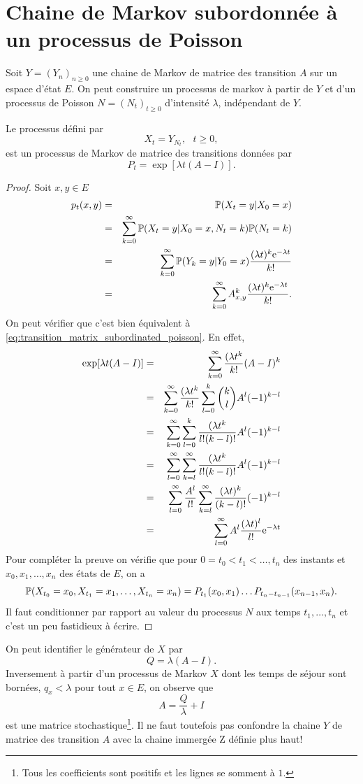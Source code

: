 \section{Chaine de Markov subordonnée à un processus de Poisson}\label{sec:subordinated_poisson}
Soit $Y=(Y_n)_{n\geq 0}$ une chaine de Markov de matrice des transition $A$ sur un espace d'état $E$. On peut construire un processus de markov à partir de $Y$ et d'un processus de Poisson $N = (N_t)_{t\geq 0}$ d'intensité $\lambda$, indépendant de $Y$.
\begin{prop}\label{prop:subordinated_poisson}
Le processus défini par 
$$
X_t = Y_{N_t},\text{ }t\geq 0,
$$
est un processus de Markov de matrice des transitions données par 
$$
P_t = \exp[\lambda t(A - I)].
$$
\end{prop}
\begin{proof}
Soit $x,y \in E$
\begin{eqnarray*}
p_t(x,y) &=& \mathbb{P}(X_t = y|X_0 = x)\\
&=&\sum_{k=0}^\infty\mathbb{P}(X_t = y|X_0 = x, N_t = k)\mathbb{P}(N_t = k)\\
&=&\sum_{k=0}^\infty\mathbb{P}(Y_k = y|Y_0 = x)\frac{(\lambda t)^k\mathrm{e}^{-\lambda t} }{k!}\\
&=&\sum_{k=0}^\infty A^k_{x,y}\frac{(\lambda t)^k\mathrm{e}^{-\lambda t} }{k!}.
\end{eqnarray*}
On peut vérifier que c'est bien équivalent à \eqref{eq:transition_matrix_subordinated_poisson}. En effet, 
\begin{eqnarray*}
\exp[\lambda t(A - I)]&=& \sum_{k=0}^\infty\frac{(\lambda t^k}{k!}(A-I)^k\\
&=&\sum_{k=0}^\infty\frac{(\lambda t^k}{k!}\sum_{l=0}^k\binom{k}{l}A^l(-1)^{k-l}\\
&=&\sum_{k=0}^\infty\sum_{l=0}^k\frac{(\lambda t^k}{l!(k-l)!}A^l(-1)^{k-l}\\
&=&\sum_{l=0}^\infty\sum_{k=l}^\infty\frac{(\lambda t^k}{l!(k-l)!}A^l(-1)^{k-l}\\
&=&\sum_{l=0}^\infty \frac{A^l}{l!}\sum_{k=l}^\infty\frac{(\lambda t)^k}{(k-l)!}(-1)^{k-l}\\
&=&\sum_{l=0}^\infty A^l\frac{(\lambda t)^l}{l!}\mathrm{e}^{-\lambda t}\\
\end{eqnarray*}
Pour compléter la preuve on vérifie que pour $0= t_0<t_1<\ldots, t_n$ des instants et $x_0, x_1,\ldots, x_n$ des états de $E$, on a 
$$
\mathbb{P}(X_{t_0} = x_0, X_{t_1} = x_1,\ldots, X_{t_n}=x_n) = P_{t_1}(x_0,x_1)\ldots P_{t_n - t_{n-1}}(x_{n-1}, x_n).
$$
Il faut conditionner par rapport au valeur du processus $N$ aux temps $t_1,\ldots, t_n$ et c'est un peu fastidieux à écrire.
\end{proof} 
On peut identifier le générateur de $X$ par
$$
Q = \lambda(A-I).
$$
Inversement à partir d'un processus de Markov $X$ dont les temps de séjour sont bornées, $q_x <\lambda$ pour tout $x\in E$, on observe que 
$$
A = \frac{Q}{\lambda} + I
$$
est une matrice stochastique\footnote{Tous les coefficients sont positifs et les lignes se somment à $1$.}. Il ne faut toutefois pas confondre la chaine $Y$ de matrice des transition $A$ avec la chaine immergée Z définie plus haut!

